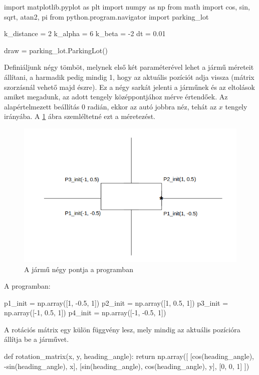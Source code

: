 \begin{python}
import matplotlib.pyplot as plt
import numpy as np
from math import cos, sin, sqrt, atan2, pi
from python.program.navigator import parking_lot

k_distance = 2
k_alpha = 6
k_beta = -2
dt = 0.01

draw = parking_lot.ParkingLot()
\end{python}

\bigskip

Definiáljunk négy tömböt, melynek első két paraméterével lehet a jármű méreteit állítani, a harmadik pedig mindig 1, hogy az aktuális pozíciót adja vissza (mátrix szorzásnál vehető majd észre). Ez a négy sarkát jelenti a járműnek és az eltolások amiket megadunk, az adott tengely középpontjához mérve értendőek. Az alapértelmezett beállítás 0 radián, ekkor az autó jobbra néz, tehát az $ x $ tengely irányába. A \ref{fig:vehicle_points} ábra szemléltetné ezt a méretezést.

\begin{figure}[h!]
\centering
\includegraphics[scale=0.70]{images/vehicle_points.png}
\caption{A jármű négy pontja a programban}
\label{fig:vehicle_points}
\end{figure}

A programban:
\begin{python}
p1_init = np.array([1, -0.5, 1])
p2_init = np.array([1, 0.5, 1])
p3_init = np.array([-1, 0.5, 1])
p4_init = np.array([-1, -0.5, 1])
\end{python}

A rotációs mátrix egy külön függvény lesz, mely mindig az aktuális pozícióra állítja be a járművet.
\begin{python}
def rotation_matrix(x, y, heading_angle):
    return np.array([
        [cos(heading_angle), -sin(heading_angle), x],
        [sin(heading_angle), cos(heading_angle), y],
        [0, 0, 1]
    ])
\end{python}

